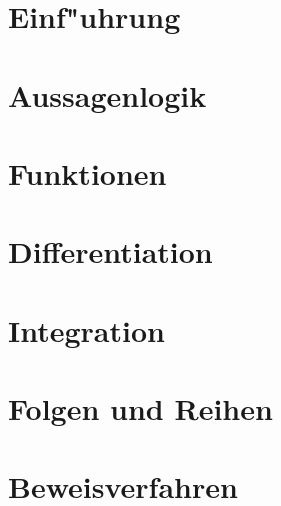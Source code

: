 \documentclass[12pt,a4paper,titlepage]{scrartcl}
\newcommand{\psection}[1]{\pagebreak\section{#1}}
\begin{document}


\psection{Einf"uhrung}


\psection{Aussagenlogik}



\psection{Funktionen}


\psection{Differentiation}


\psection{Integration}


\psection{Folgen und Reihen}


\psection{Beweisverfahren}

\end{document}
